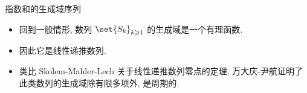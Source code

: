 \documentclass[aspectratio=169,handout]{ctexbeamer}
\begin{document}
\begin{frame}{指数和的生成域序列}
	\begin{itemize}
		\item 回到一般情形, 数列 $\set{S_k}_{k\ge 1}$ 的生成域是一个有理函数.
		\item 因此它是线性递推数列.
		\item 类比 Skolem-Mahler-Lech 关于线性递推数列零点的定理, 万大庆-尹航证明了此类数列的生成域除有限多项外, 是周期的.
	\end{itemize}
\end{frame}
\end{document}
